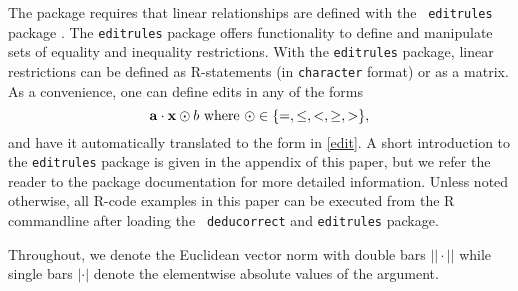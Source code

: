 \documentclass[11pt, fleqn, a4paper]{article}
\begin{document}
The package requires that linear relationships are defined with the {\tt
editrules} package \citep{jonge:2011}.  The {\tt editrules} package offers
functionality to define and manipulate sets of equality and
inequality restrictions. With the {\tt editrules} package, linear restrictions
can be defined as R-statements (in {\tt character} format) or as a matrix. As
a convenience, one can define edits in any of the forms
\begin{equation}
{\bf a}\cdot{\bf x} \odot b\textrm{ where } \odot \in\{=,\leq,<,\geq,>\},
\end{equation}
and have it automatically translated to the form in \eqref{edit}. A
short introduction to the {\tt editrules} package is given in the appendix of
this paper, but we refer the reader to the package documentation for more
detailed information.  Unless noted otherwise, all R-code examples in this
paper can be executed from the R commandline after loading the {\tt
deducorrect} and {\tt editrules} package. 

Throughout, we denote the Euclidean vector norm with double bars $||\cdot||$
while single bars $|\cdot|$ denote the elementwise absolute values of the
argument.
\end{document}
